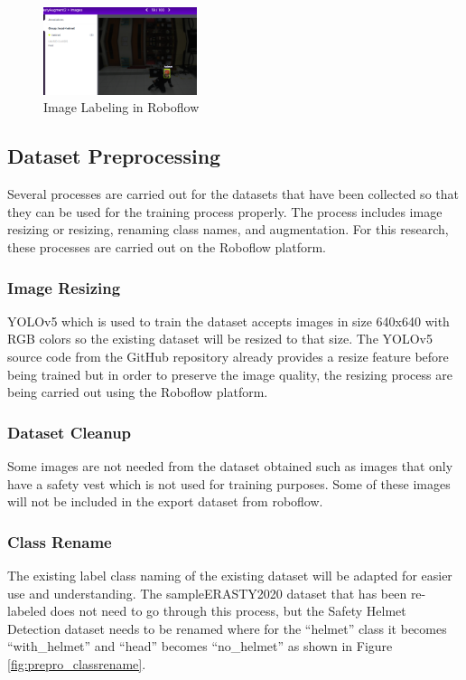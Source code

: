 \begin{figure}[ht]
  \centering
  \includegraphics[width=0.4\textwidth]{gambar/utilities/labeldiroboflow.png}
  \caption{Image Labeling in Roboflow}
  \label{fig:gambarbesertalabel}  
\end{figure}

\subsection{Dataset Preprocessing}
\label{subsec:dataset_preprocessing}

\par Several processes are carried out for the datasets that have been collected so that they can be used for the training process properly. The process includes image resizing or resizing, renaming class names, and augmentation. For this research, these processes are carried out on the Roboflow platform.

\subsubsection{Image Resizing}
\label{subsec:imageresize}
\par YOLOv5 which is used to train the dataset accepts images in size 640x640 with RGB colors so the existing dataset will be resized to that size. The YOLOv5 source code from the GitHub repository already provides a resize feature before being trained but in order to preserve the image quality, the resizing process are being carried out using the Roboflow platform. 

\subsubsection{Dataset Cleanup}
\label{subsec:datasetcleanup}
\par Some images are not needed from the dataset obtained such as images that only have a safety vest which is not used for training purposes. Some of these images will not be included in the export dataset from roboflow.

\subsubsection{Class Rename}
\label{subsec:classrename}
\par The existing label class naming of the existing dataset will be adapted for easier use and understanding. The sampleERASTY2020 dataset that has been re-labeled does not need to go through this process, but the Safety Helmet Detection dataset needs to be renamed where for the “helmet” class it becomes “with\_helmet” and “head” becomes “no\_helmet” as shown in Figure \ref{fig:prepro_classrename}.

